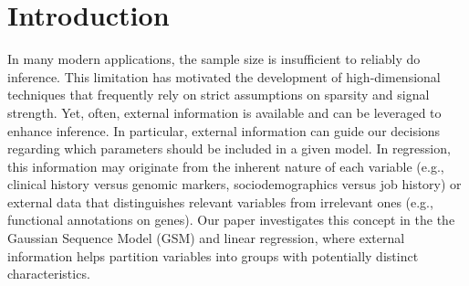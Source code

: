 \documentclass[aos]{imsart}
\theoremstyle{plain}
\begin{document}
\begin{frontmatter}
\begin{abstract}
Vestibulum rhoncus pretium ex, egestas facilisis neque efficitur quis. Morbi malesuada volutpat erat, sed aliquet lectus dictum ac. Aenean ligula massa, consequat a blandit id, placerat.
\end{abstract}

\begin{keyword}[class=MSC]
\end{keyword}

\begin{keyword}
\end{keyword}

\end{frontmatter}


\section{Introduction} 

In many modern applications, the sample size is insufficient to reliably do inference. This limitation has motivated the development of high-dimensional techniques that frequently rely on strict assumptions on sparsity and signal strength. Yet, often, external information is available and can be leveraged to enhance inference.
In particular, external information can guide our decisions regarding which parameters should be included in a given model. In regression, this information may originate from the inherent nature of each variable (e.g., clinical history versus genomic markers, sociodemographics versus job history) or external data that distinguishes relevant variables from irrelevant ones (e.g., functional annotations on genes). 
Our paper investigates this concept in the the Gaussian Sequence Model (GSM) and linear regression, where external information helps partition variables into groups with potentially distinct characteristics.
\end{document}
